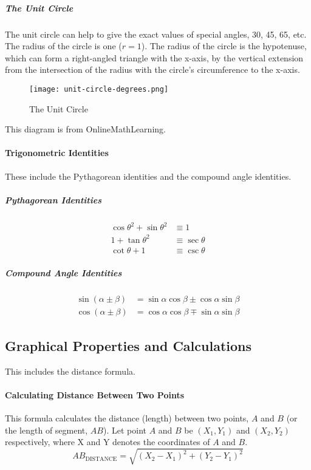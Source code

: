 \documentclass{article}
\begin{document}
            \subparagraph{The Unit Circle}\label{UC:1} The unit circle can help to give the exact values of special angles, 30\degree, 45\degree, 65\degree, etc. The radius of the circle is one ($r=1$). The radius of the circle is the hypotenuse, which can form a right-angled triangle with the x-axis, by the vertical extension from the intersection of the radius with the circle's circumference to the x-axis.
            \begin{figure}[h!]
                \texttt{[image: unit-circle-degrees.png]}
                \caption{The Unit Circle}
                \label{fig:uc1}
            \end{figure}\newpage
            This diagram is from OnlineMathLearning\autocite{UNIT_CIRCLE:1}.
        \paragraph{Trigonometric Identities} These include the Pythagorean identities and the compound angle identities.
            \subparagraph{Pythagorean Identities}
            \begin{align}
                \cos{\theta}^2 + \sin{\theta}^2 &\equiv 1 \\
                1 + \tan{\theta}^2 &\equiv \sec{\theta} \\
                \cot{\theta} + 1 &\equiv \csc{\theta}
            \end{align}
            \subparagraph{Compound Angle Identities}
            \begin{align}
                \sin{(\alpha \pm \beta)} &= \sin{\alpha}\cos{\beta} \pm \cos{\alpha}\sin{\beta} \\
                \cos{(\alpha \pm \beta)} &= \cos{\alpha}\cos{\beta} \mp \sin{\alpha}\sin{\beta}
            \end{align}
            \newpage
        \subsection{Graphical Properties and Calculations} This includes the distance formula.
        \paragraph{Calculating Distance Between Two Points} This formula calculates the distance (length) between two points, $A$ and $B$ (or the length of segment, $AB$). Let point $A$ and $B$ be $(X_1, Y_1)$ and $(X_2, Y_2)$ respectively, where X and Y denotes the coordinates of $A$ and $B$.
        \begin{equation}
            AB_{\mathrm{DISTANCE}} = \sqrt{(X_2 - X_1)^2 + (Y_2 - Y_1)^2}
        \end{equation}
        
\end{document}
